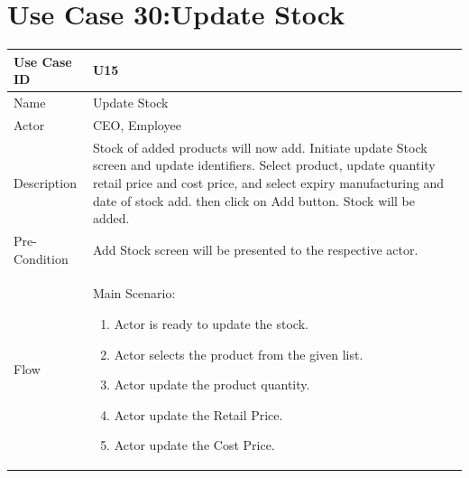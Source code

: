 \documentclass[12pt,a4paper]{report}
\begin{document}
\section{Use Case 30:Update Stock}

\begin{tabular}{ | m{3cm} | m{12cm}| } \hline

Use Case ID &  U15 \\\hline

Name  	    &  Update Stock \\ \hline

Actor     	& CEO, Employee \\ \hline

Description &  Stock of added products will now add. Initiate update Stock screen and update identifiers. Select product, update quantity retail price and cost price, and select expiry manufacturing and date of stock add. then click on Add button. Stock will be added.\\ \hline

Pre-Condition &  Add Stock screen will be presented to the respective actor. \\ \hline

Flow & Main Scenario:

\begin{enumerate}

\item Actor is ready to update the stock.
\item Actor selects the product from the given list.
\item Actor update the product quantity.
\item Actor update the Retail Price.
\item Actor update the Cost Price.
\end{enumerate}
\\ \hline
\end{tabular}
\end{document}
